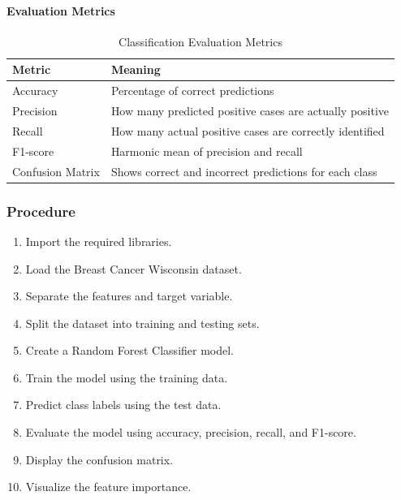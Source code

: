\documentclass[a4paper,11pt]{article}
\begin{document}
\paragraph{Evaluation Metrics}
\begin{table}[H]
\centering
\caption{Classification Evaluation Metrics}
\begin{tabular}{ll}
\toprule
\textbf{Metric} & \textbf{Meaning} \\
\midrule
Accuracy         & Percentage of correct predictions \\
Precision        & How many predicted positive cases are actually positive \\
Recall           & How many actual positive cases are correctly identified \\
F1-score         & Harmonic mean of precision and recall \\
Confusion Matrix & Shows correct and incorrect predictions for each class \\
\bottomrule
\end{tabular}
\end{table}

\subsubsection{Procedure}
\begin{enumerate}
    \item Import the required libraries.
    \item Load the Breast Cancer Wisconsin dataset.
    \item Separate the features and target variable.
    \item Split the dataset into training and testing sets.
    \item Create a Random Forest Classifier model.
    \item Train the model using the training data.
    \item Predict class labels using the test data.
    \item Evaluate the model using accuracy, precision, recall, and F1-score.
    \item Display the confusion matrix.
    \item Visualize the feature importance.
\end{enumerate}
\end{document}
